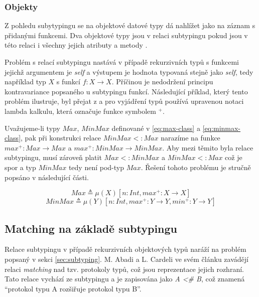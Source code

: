 \documentclass[czech,DP]{thesiskiv}
\begin{document}
\subsubsection{Objekty} 	

Z pohledu subytypingu se na objektové datové typy dá nahlížet jako na záznam s přidanými funkcemi. Dva objektové typy jsou v relaci subtypingu pokud jsou v této relaci i všechny jejich atributy a metody \cite{abadi1995subytping}. 

Problém s relací subtypingu nastává v případě rekurzivních typů s funkcemi jejichž argumentem je \textit{self} a výstupem je hodnota typovaná stejně jako \textit{self}, tedy například typ $X$ s funkcí $f: X \rightarrow X$. Příčinou je nedodržení principu kontravariance popsaného u subtypingu funkcí. Následující příklad, který tento problém ilustruje, byl přejat z  \cite{abadi1995subytping} a pro vyjádření typů používá upravenou notaci lambda kalkulu, která označuje funkce symbolem $^+$. 

Uvažujeme-li typy $Max$, $MinMax$ definované v \ref{eq:max-class} a \ref{eq:minmax-class}, pak při konstrukci relace $MinMax <: Max$ narazíme na funkce $max^+: Max \rightarrow Max$ a $max^+: MinMax \rightarrow MinMax$. Aby mezi těmito byla relace subtypingu, musí zároveň platit $Max <: MinMax$ a $MinMax <: Max$ což je spor a typ $MinMax$ tedy není pod-typ $Max$. Řešení tohoto problému je stručně popsáno v následující části.

\begin{equation}
	Max \triangleq \mu(X)[n:Int, max^+:X\rightarrow X] 
	\label{eq:max-class}
\end{equation} 
\begin{equation}
	MinMax \triangleq \mu(Y)[n:Int, max^+:Y\rightarrow Y, min^+: Y \rightarrow Y] 	
	\label{eq:minmax-class}
\end{equation}

\subsection{Matching na základě subtypingu}

Relace subtypingu v případě rekurzivních objektových typů naráží na problém popsaný v sekci \ref{sec:subtyping}. M. Abadi a L. Cardeli ve svém článku  \cite{abadi1995subytping} zavádějí relaci \textit{matching} nad tzv. protokoly typů, což jsou reprezentace jejich rozhraní. Tato relace vychází ze subtypingu a je zapisována jako \textit{A <\# B}, což znamená ``protokol typu A rozšiřuje protokol typu B''. 
\end{document}
